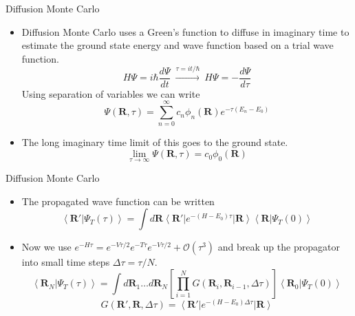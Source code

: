 \documentclass{beamer}
\newcommand{\ket}[1]{\left| #1 \right>}
\newcommand{\bra}[1]{\left< #1 \right|}
\newcommand{\braket}[2]{\left< #1 | #2 \right>}
\newcommand{\R}{\mathbf{R}}
\newcommand{\dt}{\Delta\tau}
\begin{document}
\begin{frame}{Diffusion Monte Carlo}
\begin{itemize}
   \item Diffusion Monte Carlo uses a Green's function to diffuse in imaginary time to estimate the ground state energy and wave function based on a trial wave function.
   \begin{equation*}
      H\Psi = i\hbar\frac{d\Psi}{dt} ~ \xrightarrow{\tau=it/\hbar} ~ H\Psi = -\frac{d\Psi}{d\tau}
   \end{equation*}
   Using separation of variables we can write
   \begin{equation*}
      \Psi(\R,\tau) = \sum\limits_{n=0}^{\infty} c_n\phi_n(\R) e^{-\tau(E_n-E_0)}
   \end{equation*}
   \item The long imaginary time limit of this goes to the ground state.
   \begin{equation*}
      \lim\limits_{\tau\rightarrow\infty} \Psi(\R,\tau) = c_0\phi_0(\R)
   \end{equation*}
\end{itemize}
\end{frame}

\begin{frame}{Diffusion Monte Carlo}
\begin{itemize}
   \item The propagated wave function can be written
   \begin{equation*}
      \braket{\R'}{\Psi_T(\tau)} = \int d\R \bra{\R'}e^{-(H-E_0)\tau}\ket{\R}\braket{\R}{\Psi_T(0)}
   \end{equation*}
   \item Now we use $e^{-H\tau}=e^{-V\tau/2}e^{-T\tau}e^{-V\tau/2}+\mathcal{O}(\tau^3)$ and break up the propagator into small time steps $\dt = \tau/N$.
   \begin{equation*}
      \braket{\R_N}{\Psi_T(\tau)} = \int d\R_1 \ldots d\R_N \left[\prod\limits_{i=1}^N G(\R_i,\R_{i-1},\Delta\tau)\right] \braket{\R_0}{\Psi_T(0)}
   \end{equation*}
   \begin{equation*}
      G(\R',\R,\Delta\tau) = \bra{\R'}e^{-(H-E_0)\Delta\tau}\ket{\R}
   \end{equation*}
\end{itemize}
\end{frame}
\end{document}
